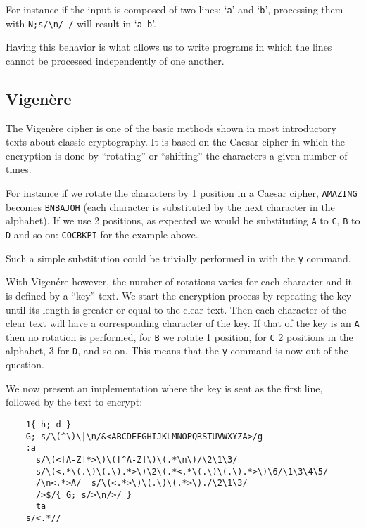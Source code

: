 For instance if the input is composed of two lines: `{\tt a}' and `{\tt b}',
processing them with \verb|N;s/\n/-/| will result in `{\tt a-b}'.

Having this behavior is what allows us to write programs in which the lines
cannot be processed independently of one another.

\subsection{Vigen\`ere}

The Vigen\`ere cipher is one of the basic methods shown in most introductory
texts about classic cryptography.  It is based on the Caesar cipher in which the
encryption is done by ``rotating'' or ``shifting'' the characters a given
number of times.

For instance if we rotate the characters by 1 position in a Caesar cipher,
{\tt AMAZING} becomes {\tt BNBAJOH} (each character is substituted by the
next character in the alphabet).  If we use 2 positions, as expected we would
be substituting {\tt A} to {\tt C}, {\tt B} to {\tt D} and so on:
{\tt COCBKPI} for the example above.

Such a simple substitution could be trivially performed in \sed with the
{\tt y} command.

With Vigen\'ere however, the number of rotations varies for each character and
it is defined by a ``key'' text.  We start the encryption process by repeating
the key until its length is greater or equal to the clear text.  Then each
character of the clear text will have a corresponding character of the key.
If that of the key is an {\tt A} then no rotation is performed,
for {\tt B} we rotate 1 position, for {\tt C} 2 positions in the alphabet,
3 for {\tt D}, and so on.  This means that the {\tt y} command is now out of
the question.

We now present an implementation where the key is sent as the first line,
followed by the text to encrypt:

\begin{Verbatim}
	1{ h; d }
	G; s/\(^\)\|\n/&<ABCDEFGHIJKLMNOPQRSTUVWXYZA>/g
	:a
	  s/\(<[A-Z]*>\)\([^A-Z]\)\(.*\n\)/\2\1\3/
	  s/\(<.*\(.\)\(.\).*>\)\2\(.*<.*\(.\)\(.\).*>\)\6/\1\3\4\5/
	  /\n<.*>A/  s/\(<.*>\)\(.\)\(.*>\)./\2\1\3/
	  />$/{ G; s/>\n/>/ }
	  ta
	s/<.*//
\end{Verbatim}

